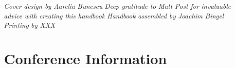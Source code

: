 \documentclass[twoside,makeidx]{book}
\begin{document}


\fancyfoot[C]{}





\cleardoublepage
\thispagestyle{empty}
\vspace*{6in}
\begin{linez}
\emph{Cover design by Aurelia Bunescu}
\emph{Deep gratitude to Matt Post for invaluable advice with creating this handbook}
\emph{Handbook assembled by Joachim Bingel}
\emph{Printing by XXX}
\end{linez}
%
%
%
%

\newpage
\cleardoublepage
\fancyfoot[C]{\thepage}
\frontmatter





\setcounter{tocdepth}{2}
\tableofcontents
\mainmatter
\pagestyle{fancy}


\clearpage
\setheaders{}{}



\chapter{Conference Information}
\end{document}
